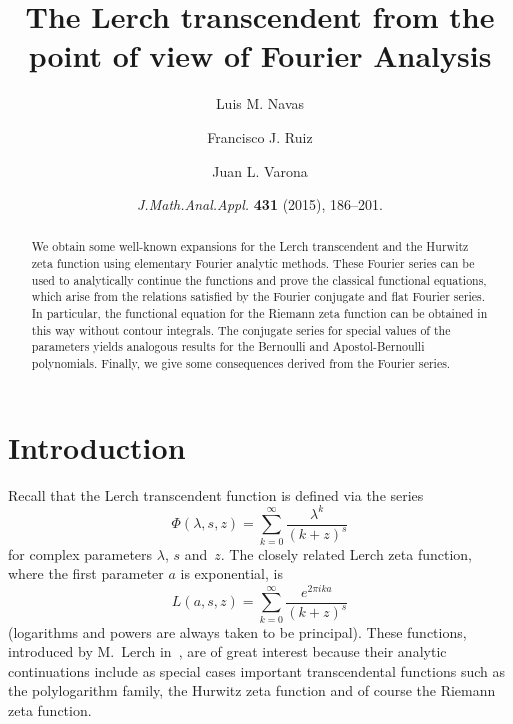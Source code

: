 \documentclass[11pt,a4paper,reqno]{amsart}
\date{\textit{J.\@ Math.\@ Anal.\@ Appl.\@} \textbf{431} (2015), 186--201.}
\title[Lerch transcendent and Fourier Analysis]{The Lerch transcendent from the point of view of Fourier Analysis}
\author[L.~M.~Navas]{Luis M. Navas}
\author[F.~J.~Ruiz]{Francisco J. Ruiz}
\author[J.~L.~Varona]{Juan L. Varona}
\theoremstyle{plain}
\theoremstyle{remark}
\numberwithin{equation}{section}
\begin{document}


\begin{abstract}
We obtain some well-known expansions for the Lerch transcendent and the Hurwitz zeta function using elementary Fourier analytic methods. These Fourier series can be used to analytically continue the functions and prove the classical functional equations, which arise from the relations satisfied by the Fourier conjugate and flat Fourier series. In particular, the functional equation for the Riemann zeta function can be obtained in this way without contour integrals. The conjugate series for special values of the parameters yields analogous results for the Bernoulli and Apostol-Bernoulli polynomials. Finally, we give some consequences derived from the Fourier series.
\end{abstract}

\maketitle


\section{Introduction}
\label{sec:intro}

Recall that the Lerch transcendent function is defined via the series
\begin{equation*}
  \Phi(\lambda,s,z) = \sum_{k=0}^\infty\frac{\lambda^k}{(k+z)^s}
\end{equation*}
for complex parameters $\lambda$, $s$ and~$z$. 
The closely related Lerch zeta function, where the first parameter $a$ is exponential, is
\begin{equation}
\label{eq:Lerchzeta}
  L(a,s,z) = \sum_{k=0}^\infty\frac{e^{2\pi ika}}{(k+z)^s}
\end{equation}
(logarithms and powers are always taken to be principal).
These functions, introduced by M.~Lerch in~\cite{Lerch}, are of great interest because their analytic continuations include as special cases important transcendental functions such as the polylogarithm family, the Hurwitz zeta function and of course the Riemann zeta function.
\end{document}
